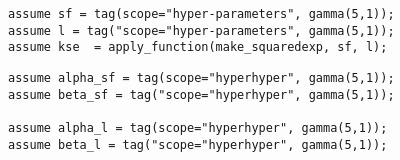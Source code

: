 \begin{lstlisting}[mathescape,escapechar=\#]
assume sf = tag(scope="hyper-parameters", gamma(5,1));
assume l = tag("scope="hyper-parameters", gamma(5,1));
assume kse  = apply_function(make_squaredexp, sf, l);

\end{lstlisting}

\begin{lstlisting}[mathescape,escapechar=\#]
assume alpha_sf = tag(scope="hyperhyper", gamma(5,1));
assume beta_sf = tag("scope="hyperhyper", gamma(5,1));

assume alpha_l = tag(scope="hyperhyper", gamma(5,1));
assume beta_l = tag("scope="hyperhyper", gamma(5,1));
\end{lstlisting}
